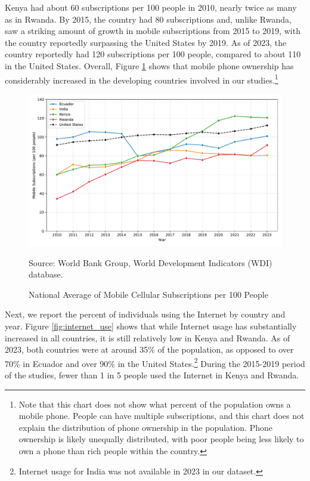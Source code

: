 \documentclass[12pt]{article}
\begin{document}
Kenya had about 60 subscriptions per 100 people in 2010, nearly twice as many as in Rwanda. By 2015, the country had 80 subscriptions and, unlike Rwanda, saw a striking amount of growth in mobile subscriptions from 2015 to 2019, with the country reportedly surpassing the United States by 2019. As of 2023, the country reportedly had 120 subscriptions per 100 people, compared to about 110 in the United States. Overall, Figure \ref{fig:mobile_subscriptions} shows that mobile phone ownership has considerably increased in the developing countries involved in our studies.\footnote{Note that this chart does not show what percent of the population owns a mobile phone. People can have multiple subscriptions, and this chart does not explain the distribution of phone ownership in the population. Phone ownership is likely unequally distributed, with poor people being less likely to own a phone than rich people within the country.}
\begin{figure}[H]
    \centering
    \caption{National Average of Mobile Cellular Subscriptions per 100 People}
    \includegraphics[width=\textwidth]{../output/mobile_subscriptions.pdf}
    \begin{minipage}{0.9\textwidth}
    \footnotesize
    Source: World Bank Group, World Development Indicators (WDI) database. 
    \end{minipage}
    \label{fig:mobile_subscriptions}
\end{figure}

Next, we report the percent of individuals using the Internet by country and year. Figure \ref{fig:internet_use} shows that while Internet usage has substantially increased in all countries, it is still relatively low in Kenya and Rwanda. As of 2023, both countries were at around 35\% of the population, as opposed to over 70\% in Ecuador and over 90\% in the United States.\footnote{Internet usage for India was not available in 2023 in our dataset.} During the 2015-2019 period of the \textcite{fabregas_digital_2025} studies, fewer than 1 in 5 people used the Internet in Kenya and Rwanda.
\end{document}
